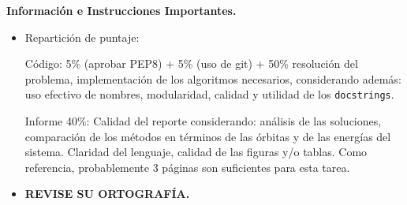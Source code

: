 \documentclass[letter, 11pt]{article}
\begin{document}
\vspace{2em}
\noindent\textbf{Información e Instrucciones Importantes.}
\begin{itemize}

\item Repartición de puntaje:

  \subitem Código: 5\% (aprobar PEP8) + 5\% (uso de git) + 50\% resolución del
  problema, implementación de los algoritmos necesarios, considerando además:
  uso efectivo de nombres, modularidad, calidad y utilidad de los
  \texttt{docstrings}.
  
  \subitem Informe 40\%: Calidad del reporte considerando: análisis de las
  soluciones, comparación de los métodos en términos de las órbitas y de las
  energías del sistema. Claridad del lenguaje, calidad de las figuras y/o
  tablas. Como referencia, probablemente 3 páginas son suficientes para esta
  tarea.

\item \textbf{REVISE SU ORTOGRAFÍA.}

\end{itemize}
\end{document}
